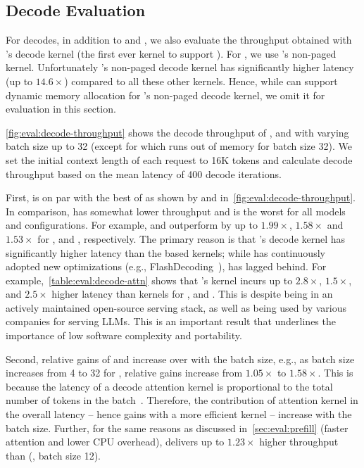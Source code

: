 \subsection{Decode Evaluation}
\label{sec:eval:decode}

For decodes, in addition to \fapaged and \fipaged, we also evaluate the throughput obtained with \vllm's decode kernel (the first ever kernel to support \pa). For \sysname, we use \flashattention's non-paged kernel. Unfortunately \flashinfer's non-paged decode kernel has significantly higher latency (up to $14.6\times$) compared to all these other kernels. Hence, while \sysname can support dynamic memory allocation for \flashinfer's non-paged decode kernel, we omit it for evaluation in this section. %


 \autoref{fig:eval:decode-throughput} shows the decode throughput of \yismall, \llamasmall and \yimedium with varying batch size up to 32 (except for \yimedium which runs out of memory for batch size 32). We set the initial context length of each request to 16K tokens and calculate decode throughput based on the mean latency of 400 decode iterations.




First, \sysname is on par with the best of \pa as shown by \fapaged and \favattention in~\autoref{fig:eval:decode-throughput}. In comparison, \fipaged has somewhat lower throughput and \vllm is the worst for all models and configurations. For example, \fapaged and \favattention outperform \vllm by up to $1.99\times$, $1.58\times$ and $1.53\times$ for \yismall, \llamasmall and \yimedium, respectively. The primary reason is that \vllm's decode kernel has significantly higher latency than the \flashattention based kernels; while \flashattention has continuously adopted new optimizations (e.g., FlashDecoding~\cite{flashdecoding}), \vllm has lagged behind. For example,~\autoref{table:eval:decode-attn} shows that \vllm's \pa kernel incurs up to $2.8\times$, $1.5\times$, and $2.5\times$ higher latency than \flashattention kernels for \yismall, \llamasmall and \yimedium. This is despite \vllm being in an actively maintained open-source serving stack, as well as being used by various companies for serving LLMs. This is an important result that underlines the importance of low software complexity and portability.




Second, relative gains of \favattention and \fapaged increase over \vllm with the batch size, e.g., as batch size increases from 4 to 32 for \llamasmall, relative gains increase from $1.05\times$ to $1.58\times$. This is because the latency of a decode attention kernel is proportional to the total number of tokens in the batch~\cite{vidur}. Therefore, the contribution of attention kernel in the overall latency -- hence gains with a more efficient kernel -- increase with the batch size. Further, for the same reasons as discussed in~\autoref{sec:eval:prefill} (faster attention and lower CPU overhead), \favattention delivers up to $1.23\times$ higher throughput than \fipaged (\yismall, batch size 12). 


